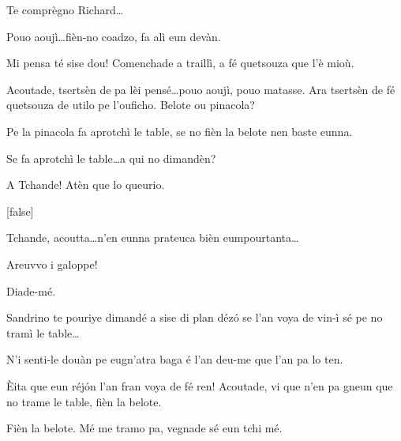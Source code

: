 \begin{drama}
\Gerominespeaks{} Te comprègno Richard\ldots

\Richardspeaks Pouo aoujì\ldots fièn-no coadzo, fa alì eun devàn.

\Tuenospeaks Mi pensa té sise dou! Comenchade a traillì, a fé quetsouza que l'è mioù.


\Richardspeaks  Acoutade, tsertsèn de pa lèi pensé\ldots pouo aoujì, pouo matasse. Ara tsertsèn de fé quetsouza de utilo pe l'ouficho.  Belote ou pinacola?


\Gerominespeaks Pe la pinacola fa aprotchì le table, se no fièn la belote nen baste eunna.


\Saventaspeaks Se fa aprotchì le table\ldots a qui no dimandèn? 

\Tuenospeaks A Tchande! Atèn que lo queurio.


[false]\label{tel}
\vspace*{-3pt}


\Tuenospeaks Tchande, acoutta\ldots n'en eunna prateuca bièn eumpourtanta\ldots

\Sandrinospeaks Areuvvo i galoppe!


\Sandrinospeaks Diade-mé.

\Gerominespeaks Sandrino te pouriye dimandé a sise di plan déz\'o se l'an voya de vin-ì sé pe no tramì le table\ldots

\Sandrinospeaks N'i senti-le douàn pe eugn'atra baga é l'an deu-me que l'an pa lo ten.


\Richardspeaks \`Eita que eun réj\'on l'an fran voya de fé ren! Acoutade, vi que n'en pa gneun que no trame le table, fièn la belote.

\Tuenospeaks Fièn la belote. Mé me tramo pa, vegnade sé eun tchi mé.



\end{drama}
